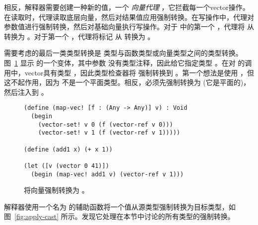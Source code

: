 \documentclass[11pt]{book}
\begin{document}
相反，解释器需要创建一种新的值，一个
\emph{向量代理} ，它拦截每一个vector操作。在读取时，代理读取底层向量，然后对结果值应用强制转换。在写操作中，代理对参数值进行强制转换，然后对基础向量执行写操作。对于  中的第一个  ，代理将  从  转换为  。对于第一个
 ，代理将标记  从  转换为  。

需要考虑的最后一类类型转换是  类型与函数类型或向量类型之间的类型转换。图~\ref{fig:map-vec-any} 显示 
的一个变体，其中参数  没有类型注释，因此给它指定类型  。在对  的调用中，vector具有类型  ，因此类型检查器将  强制转换到  。第一个想法是使用  ，但这不起作用，因为
 不是一个平面类型。相反，必须先强制转换为  (它是平面的)，然后注入到  。

\begin{figure}[tbp]
\begin{lstlisting}
(define (map-vec! [f : (Any -> Any)] v) : Void
  (begin
    (vector-set! v 0 (f (vector-ref v 0)))
    (vector-set! v 1 (f (vector-ref v 1)))))

(define (add1 x) (+ x 1))

(let ([v (vector 0 41)])
  (begin (map-vec! add1 v) (vector-ref v 1)))
\end{lstlisting}
\caption{将向量强制转换为  。}
\label{fig:map-vec-any}
\end{figure}

 \LangCast{} 解释器使用一个名为
 的辅助函数将一个值从源类型强制转换为目标类型，如图~\ref{fig:apply-cast} 所示。发现它处理在本节中讨论的所有类型的强制转换。
\end{document}
